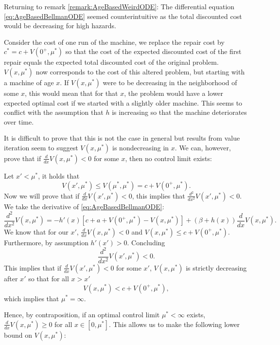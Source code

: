 \begin{remark}\label{remark:AgeBasedValueNonDecreasing}
	Returning to remark \ref{remark:AgeBasedWeirdODE}:
	The differential equation \eqref{eq:AgeBasedBellmanODE} seemed counterintuitive as the total discounted cost would be decreasing for high hazards.
	
	Consider the cost of one run of the machine, we replace the repair cost by $c^*=c+V(0^+,\mu^*)$ so that the cost of the expected discounted cost of the first repair equals the expected total discounted cost of the original problem.
	$V(x,\mu^*)$ now corresponds to the cost of this altered problem, but starting with a machine of age $x$.
	If $V(x,\mu^*)$ were to be decreasing in the neighborhood of some $x$, this would mean that for that $x$, the problem would have a lower expected optimal cost if we started with a slightly older machine.
	This seems to conflict with the assumption that $h$ is increasing so that the machine deteriorates over time.
	
	It is difficult to prove that this is not the case in general but results from value iteration seem to suggest $V(x,\mu^*)$ is nondecreasing in $x$.
	We can, however, prove that if $\frac{d}{dx}V(x,\mu^*)<0$ for some $x$, then no control limit exists:
	
	Let $x'<\mu^*$, it holds that
	\[
	V(x',\mu^*)\leq V(\mu^*,\mu^*)=c+V(0^+,\mu^*).
		\]
	Now we will prove that if $\frac{d}{dx}V(x',\mu^*)<0$, this implies that $\frac{d^2}{dx^2}V(x',\mu^*)<0$.
	We take the derivative of \eqref{eq:AgeBasedBellmanODE}:
	\[
	\frac{d^2}{dx^2}V(x,\mu^*)=-h'(x)[c+a+V(0^+,\mu^*)-V(x,\mu^*)]+(\beta+h(x))\frac{d}{dx}V(x,\mu^*).
	\]
	We know that for our $x'$, $\frac{d}{dx}V(x,\mu^*)<0$ and $V(x,\mu^*)\leq c+V(0^+,\mu^*)$.
	Furthermore, by assumption $h'(x')>0$.
	Concluding
	\[
	\frac{d^2}{dx^2}V(x',\mu^*)<0.
	\]
	This implies that if $\frac{d}{dx}V(x',\mu^*)<0$ for some $x'$, $V(x,\mu^*)$ is strictly decreasing after $x'$ so that for all $x>x'$
	\[
	V(x,\mu^*)< c+V(0^+,\mu^*),
	\]
	which implies that $\mu^*=\infty$.
	
	Hence, by contraposition, if an optimal control limit $\mu^*<\infty$ exists, $\frac{d}{dx}V(x,\mu^*)\geq0$ for all $x\in[0,\mu^*]$.
	This allows us to make the following lower bound on $V(x,\mu^*)$:
\end{remark}

